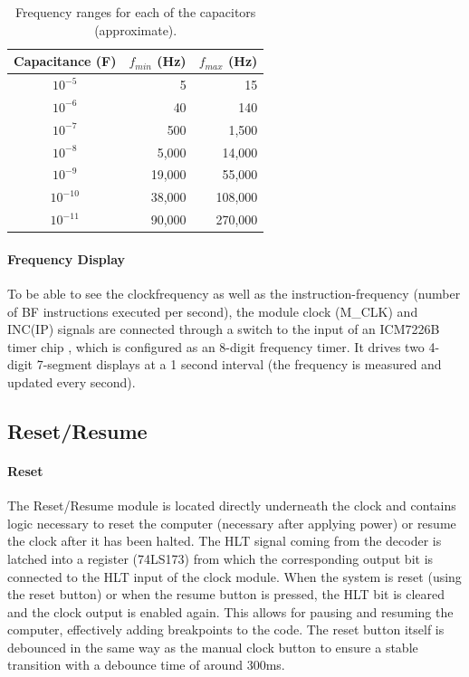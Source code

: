 \begin{table}
  \centering
  \begin{tabular}{c|r|r}
    Capacitance (F) & $f_{min}$ (Hz) & $f_{max}$ (Hz) \\ \hline
    $10^{-5}$  & 5 & 15 \\
    $10^{-6}$  & 40 & 140 \\
    $10^{-7}$  & 500 & 1,500 \\
    $10^{-8}$  & 5,000 & 14,000 \\
    $10^{-9}$  & 19,000 & 55,000 \\
    $10^{-10}$ & 38,000 & 108,000 \\
    $10^{-11}$ & 90,000 & 270,000 \\
  \end{tabular}
  \caption{Frequency ranges for each of the capacitors (approximate).}
  \label{tab:frequencycontrol}
\end{table}

\paragraph{Frequency Display} To be able to see the clockfrequency as well as the instruction-frequency (number of BF instructions executed per second), the module clock (M\_CLK) and INC(IP) signals are connected through a switch to the input of an ICM7226B timer chip \cite{7226B}, which is configured as an 8-digit frequency timer. It drives two 4-digit 7-segment displays at a 1 second interval (the frequency is measured and updated every second). 

\subsection{Reset/Resume} \label{sec:resetresume}
\paragraph{Reset} The Reset/Resume module is located directly underneath the clock and contains logic necessary to reset the computer (necessary after applying power) or resume the clock after it has been halted. The HLT signal coming from the decoder is latched into a register (74LS173) from which the corresponding output bit is connected to the HLT input of the clock module. When the system is reset (using the reset button) or when the resume button is pressed, the HLT bit is cleared and the clock output is enabled again. This allows for pausing and resuming the computer, effectively adding breakpoints to the code. The reset button itself is debounced in the same way as the manual clock button to ensure a stable transition with a debounce time of around 300ms.

